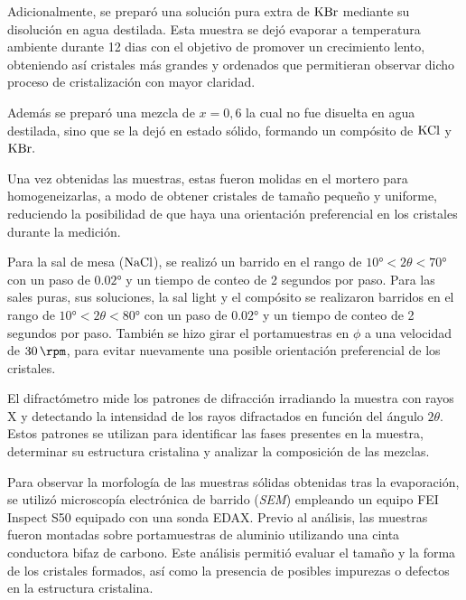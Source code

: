 Adicionalmente, se preparó una solución pura extra de $\ce{KBr}$ mediante su disolución en agua destilada. Esta muestra se dejó evaporar a temperatura ambiente durante 12 dias con el objetivo de promover un crecimiento lento, obteniendo así cristales más grandes y ordenados que permitieran observar dicho proceso de cristalización con mayor claridad.

Además se preparó una mezcla de $x=0,6$ la cual no fue disuelta en agua destilada, sino que se la dejó en estado sólido, formando un compósito de $\ce{KCl}$ y $\ce{KBr}.$

Una vez obtenidas las muestras, estas fueron molidas en el mortero para homogeneizarlas, a modo de obtener cristales de tamaño pequeño y uniforme, reduciendo la posibilidad de que haya una orientación preferencial en los cristales durante la medición.

Para la sal de mesa ($\ce{NaCl}$), se realizó un barrido en el rango de $\ang{10} < 2\theta < \ang{70}$ con un paso de $\ang{0,02}$ y un tiempo de conteo de 2 segundos por paso. Para las sales puras, sus soluciones, la sal light y el compósito se realizaron barridos en el rango de $\ang{10} < 2\theta < \ang{80}$ con un paso de $\ang{0,02}$ y un tiempo de conteo de 2 segundos por paso. También se hizo
girar el portamuestras en $\phi$ a una velocidad de $\SI{30}{\rpm}$, para evitar nuevamente una posible orientación preferencial de los cristales.

El difractómetro mide los patrones de difracción irradiando la muestra con rayos X y detectando la intensidad de los rayos difractados en función del ángulo $2\theta$. Estos patrones se utilizan para identificar las fases presentes en la muestra, determinar su estructura cristalina y analizar la composición de las mezclas.

Para observar la morfología de las muestras sólidas obtenidas tras la evaporación, se utilizó microscopía electrónica de barrido (\textit{SEM}) empleando un equipo FEI Inspect S50 equipado con una sonda EDAX. Previo al análisis, las muestras fueron montadas sobre portamuestras de aluminio utilizando una cinta conductora bifaz de carbono. Este análisis permitió evaluar el tamaño y la forma de los cristales formados, así como la presencia de posibles impurezas o defectos en la estructura cristalina.